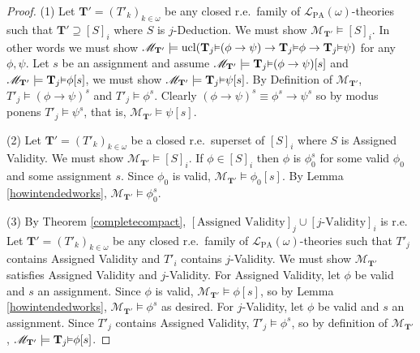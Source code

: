 \documentclass[reqno]{article}
\theoremstyle{definition}
\def\L{\mathscr{L}}
\def\M{\mathscr{M}}
\def\T{\mathbf{T}}
\def\LPA{\L_{\mathrm{PA}}}
\renewcommand{\Pr}[1]{\T_{#1}\mbox{\small${\vDash}$}}
\newcommand{\ucl}[1]{\mathrm{ucl}(#1)}
\begin{document}
\begin{proof}
\item
(1)
Let $\T'=(T'_k)_{k\in\omega}$ be any closed r.e.~family of $\LPA(\omega)$-theories
such that $\T'\supseteq [S]_i$ where $S$ is $j$-Deduction.  We must show
$\M_{\T'}\models [S]_i$.  In other words we must show
$\M_{\T'}\models \ucl{\Pr j (\phi\rightarrow\psi)
\rightarrow \Pr j\phi \rightarrow \Pr j \psi}$ for any $\phi,\psi$.
Let $s$ be an assignment and assume $\M_{\T'}\models \Pr j (\phi\rightarrow\psi)[s]$
and $\M_{\T'}\models \Pr j \phi[s]$, we must show $\M_{\T'}\models \Pr j \psi[s]$.
By Definition of $\M_{\T'}$, $T'_j\models (\phi\rightarrow\psi)^s$ and
$T'_j\models \phi^s$.  Clearly $(\phi\rightarrow\psi)^s\equiv
\phi^s\rightarrow\psi^s$ so by modus ponens $T'_j\models\psi^s$, that is,
$\M_{\T'}\models \psi[s]$.

\item
(2)
Let $\T'=(T'_k)_{k\in\omega}$ be a closed r.e.~superset of $[S]_i$ where $S$
is Assigned Validity.  We must show $\M_{\T'}\models [S]_i$.
If $\phi\in [S]_i$ then $\phi$ is $\phi^s_0$ for some valid $\phi_0$ and
some assignment $s$.  Since $\phi_0$ is valid, $\M_{\T'}\models \phi_0[s]$.
By Lemma \ref{howintendedworks}, $\M_{\T'}\models \phi^s_0$.

\item
(3)
By Theorem \ref{completecompact}, $[\mbox{Assigned Validity}]_j\cup[\mbox{$j$-Validity}]_i$
is r.e.
Let $\T'=(T'_k)_{k\in \omega}$ be any closed r.e.~family
of $\LPA(\omega)$-theories such that $T'_j$ contains Assigned Validity
and $T'_i$ contains $j$-Validity.
We must show $\M_{\T'}$ satisfies Assigned Validity and $j$-Validity.
For Assigned Validity, let $\phi$ be valid and $s$ an assignment.
Since $\phi$ is valid, $\M_{\T'}\models\phi[s]$, so by Lemma \ref{howintendedworks},
$\M_{\T'}\models\phi^s$ as desired.  For $j$-Validity,
let $\phi$ be valid and $s$ an assignment.
Since $T'_j$ contains Assigned Validity, $T'_j\models\phi^s$, so
by definition of $\M_{\T'}$, $\M_{\T'}\models \Pr j\phi[s]$.


\end{proof}
\end{document}
